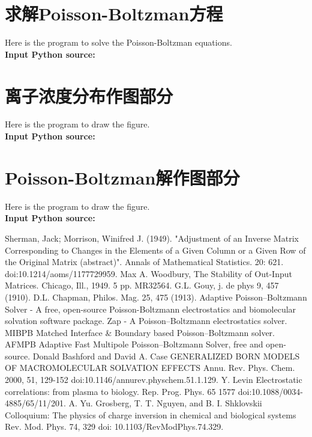 \documentclass[twoside,twocolumn]{article}
\begin{document}
\begin{CJK*}{UTF8}{gkai}
\begin{appendices}
\section{求解Poisson-Boltzman方程}
Here is the program to solve the Poisson-Boltzman equations.\\
\textbf{\textcolor[rgb]{0.98,0.00,0.00}{Input Python source:}}

\newpage
\section{离子浓度分布作图部分}
Here is the program to draw the figure.\\
\textbf{\textcolor[rgb]{0.98,0.00,0.00}{Input Python source:}}

\newpage
\section{Poisson-Boltzman解作图部分}
Here is the program to draw the figure.\\
\textbf{\textcolor[rgb]{0.98,0.00,0.00}{Input Python source:}}


\end{appendices}


\newpage
\renewcommand\refname{参考文献}
\begin{thebibliography}{99}
 Sherman, Jack; Morrison, Winifred J. (1949). "Adjustment of an Inverse Matrix Corresponding to Changes in the Elements of a Given Column or a Given Row of the Original Matrix (abstract)". Annals of Mathematical Statistics. 20: 621. doi:10.1214/aoms/1177729959.
Max A. Woodbury, The Stability of Out-Input Matrices. Chicago, Ill., 1949. 5 pp. MR32564.
 G.L. Gouy, j. de phys 9, 457 (1910).
 D.L. Chapman, Philos. Mag. 25, 475 (1913).
 Adaptive Poisson–Boltzmann Solver - A free, open-source Poisson-Boltzmann electrostatics and biomolecular solvation software package.
 Zap - A Poisson–Boltzmann electrostatics solver.
 MIBPB Matched Interface \& Boundary based Poisson–Boltzmann solver.
 AFMPB Adaptive Fast Multipole Poisson–Boltzmann Solver, free and open-source.
 Donald Bashford and David A. Case GENERALIZED BORN MODELS OF MACROMOLECULAR SOLVATION EFFECTS Annu. Rev. Phys. Chem. 2000, 51, 129-152 doi:10.1146/annurev.physchem.51.1.129.
  Y. Levin Electrostatic correlations: from plasma to biology. Rep. Prog. Phys. 65 1577 doi:10.1088/0034-4885/65/11/201.
 A. Yu. Grosberg, T. T. Nguyen, and B. I. Shklovskii Colloquium: The physics of charge inversion in chemical and biological systems Rev. Mod. Phys. 74, 329 doi: 10.1103/RevModPhys.74.329. 
\end{thebibliography} 

\end{CJK*}
\end{document}
